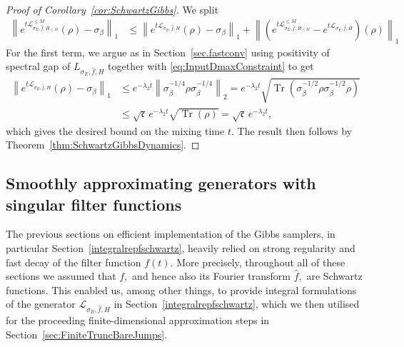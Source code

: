 \documentclass[11pt]{amsart}
\newcommand{\1}{\mathbbm{1}}
\newcommand{\Tr}{\operatorname{Tr}}
\newcommand{\cL}{\mathcal{L}}
\newcommand{\bin}[1]{}
\theoremstyle{plain}
\theoremstyle{definition}
\theoremstyle{remark}
\numberwithin{equation}{section}
\begin{document}
\begin{proof}[Proof of Corollary~\ref{cor:SchwartzGibbs}]
We split
\begin{align}
\label{eq:MajorTriangle}
   \left\|e^{t\cL^{\le M}_{\sigma_E,\widehat f,H_{\le M}}}(\rho) - \sigma_\beta\right\|_1  &\le \left\|e^{t\cL_{\sigma_E,\widehat f,H}}(\rho) - \sigma_\beta\right\|_1+\left\|\left(e^{t\cL^{\le M}_{\sigma_E,\widehat f,H_{\le M}}} -e^{t\cL_{\sigma_E,\widehat f,H}}\right)(\rho)\right\|_1  
\end{align}
For the first term, we argue as in Section~\ref{sec.fastconv} using positivity of spectral gap of $L_{\sigma_E,\widehat f,H}$ together with \eqref{eq:InputDmaxConstraint} to get
\begin{align*} \left\|e^{t\cL_{\sigma_E,\widehat{f},H}}(\rho)- \sigma_\beta\right\|_1 &\le  e^{-\lambda_2 t} \left\|\sigma_\beta^{-1/4}\rho\sigma^{-1/4}_\beta\right\|_2 = e^{-\lambda_2 t} \sqrt{\Tr\left(\sigma^{-1/2}_\beta\rho\sigma^{-1/2}_\beta\rho\right)} \\&\le \sqrt{\mathfrak{c}}\,e^{-\lambda_2 t} \sqrt{\Tr(\rho)}= \sqrt{\mathfrak{c}}\,e^{-\lambda_2 t},
\end{align*}
which gives the desired bound on the mixing time $t.$ The result then follows by Theorem~\ref{thm:SchwartzGibbsDynamics}.
\end{proof}




\subsection{Smoothly approximating generators with singular filter functions}\label{sec:singular}


\bin{Up to this point, we have developed a framework for implementing generators of Gibbs samplers associated with Schwartz functions $f$. However, in infinite dimensions, such generators typically fail to exhibit a spectral gap. In this section, we extend the framework by developing a perturbative approach that enables us to construct generators corresponding to singular potentials, in analogy with~\eqref{eq:Function}.}


The previous sections on efficient implementation of the Gibbs samplers, in particular Section~\ref{integralrepfschwartz}, heavily relied on strong regularity and fast decay of the filter function $f(t).$ More precisely, throughout all of these sections we assumed that $f,$ and hence also its Fourier transform $\widehat f,$ are Schwartz functions. This enabled us, among other things, to provide integral formulations of the generator $\cL_{\sigma_E,\widehat{f},H}$ in Section~\ref{integralrepfschwartz}, which we then utilised for the proceeding finite-dimensional approximation steps in Section~\ref{sec:FiniteTruncBareJumps}.
\end{document}

